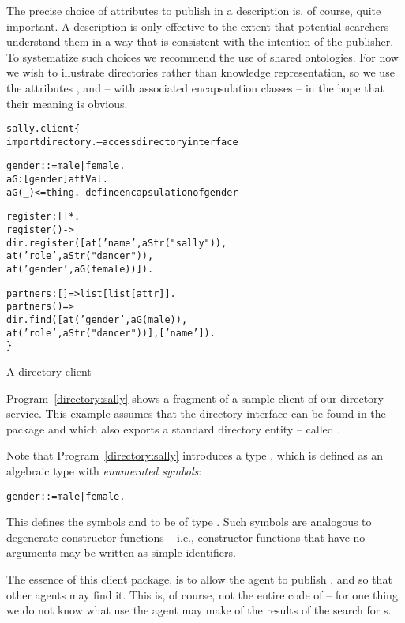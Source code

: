 The precise choice of attributes to publish in a description is, of course, quite important. A description is only effective to the extent that potential searchers understand them in a way that is consistent with the intention of the publisher. To systematize such choices we recommend the use of shared ontologies. For now we wish to illustrate directories rather than knowledge representation, so we use the attributes ,  and  -- with associated encapsulation classes -- in the hope that their meaning is obvious.

\begin{program}[tb]
\vspace{0.5ex}
\begin{alltt}
sally.client\{
  import directory.       -- access directory interface

  gender ::= male | female.
  aG:[gender]\conarrow{}attVal.
  aG(_)<=thing.           -- define encapsulation of gender
  
  register:[]*.
  register() ->
    dir.register([at('name',aStr("sally")),
                  at('role',aStr("dancer")),
                  at('gender',aG(female))]).
  
  partners:[]=>list[list[attr]].
  partners() =>
    dir.find([at('gender',aG(male)),
              at('role',aStr("dancer"))],['name']).
\}
\end{alltt}
\vspace{-2ex}
\caption{A directory client}
\label{directory:sally}
\end{program}  
Program~\vref{directory:sally} shows a fragment of a sample client of our directory service. This example assumes that the directory interface can be found in the  package and which also exports a standard directory entity -- called .

Note that Program~\ref{directory:sally} introduces a type , which is defined as an algebraic type with \emph{enumerated symbols}:
\begin{alltt}
gender ::= male | female.
\end{alltt}
This defines the symbols  and  to be of type . Such symbols are analogous to degenerate constructor functions -- i.e., constructor functions that have no arguments may be written as simple identifiers.

The essence of this client package, is to allow the  agent to publish ,  and  so that other agents may find it. This is, of course, not the entire code of  -- for one thing we do not know what use the agent may make of the results of the search for s. 

